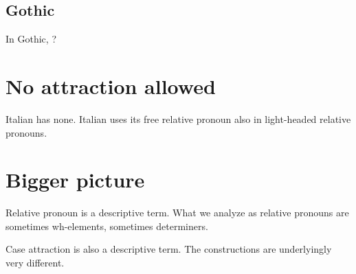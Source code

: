     \subsection{Gothic}
In Gothic, ?



\section{No attraction allowed}
Italian has none. Italian uses its free relative pronoun also in light-headed relative pronouns.


  \section{Bigger picture}
Relative pronoun is a descriptive term. What we analyze as relative pronouns are sometimes wh-elements, sometimes determiners.

Case attraction is also a descriptive term. The constructions are underlyingly very different.
